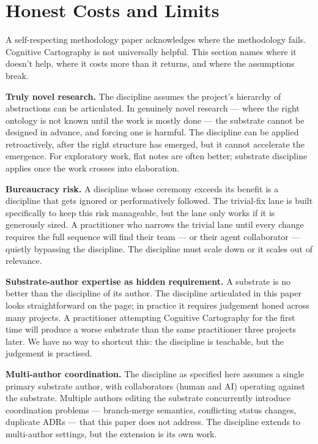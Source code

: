 \documentclass[11pt,a4paper,twocolumn]{article}
\begin{document}
\section{Honest Costs and Limits}
\label{sec:limits}

A self-respecting methodology paper acknowledges where the
methodology fails. Cognitive Cartography is not universally
helpful. This section names where it doesn't help, where it costs
more than it returns, and where the assumptions break.

\textbf{Truly novel research.} The discipline assumes the project's
hierarchy of abstractions can be articulated. In genuinely novel
research --- where the right ontology is not known until the work
is mostly done --- the substrate cannot be designed in advance, and
forcing one is harmful. The discipline can be applied
retroactively, after the right structure has emerged, but it
cannot accelerate the emergence. For exploratory work, flat notes
are often better; substrate discipline applies once the work
crosses into elaboration.

\textbf{Bureaucracy risk.} A discipline whose ceremony exceeds its
benefit is a discipline that gets ignored or performatively
followed. The trivial-fix lane is built specifically to keep this
risk manageable, but the lane only works if it is generously sized.
A practitioner who narrows the trivial lane until every change
requires the full sequence will find their team --- or their agent
collaborator --- quietly bypassing the discipline. The discipline
must scale down or it scales out of relevance.

\textbf{Substrate-author expertise as hidden requirement.} A
substrate is no better than the discipline of its author. The
discipline articulated in this paper looks straightforward on the
page; in practice it requires judgement honed across many projects.
A practitioner attempting Cognitive Cartography for the first time
will produce a worse substrate than the same practitioner three
projects later. We have no way to shortcut this: the discipline is
teachable, but the judgement is practised.

\textbf{Multi-author coordination.} The discipline as specified
here assumes a single primary substrate author, with collaborators
(human and AI) operating against the substrate. Multiple authors
editing the substrate concurrently introduce coordination problems
--- branch-merge semantics, conflicting status changes, duplicate
ADRs --- that this paper does not address. The discipline extends
to multi-author settings, but the extension is its own work.
\end{document}
